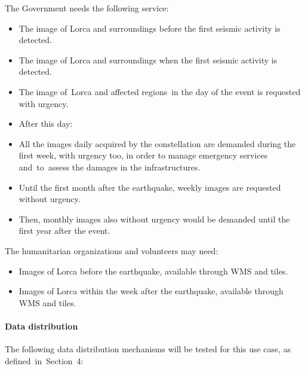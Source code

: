 \documentclass[a4paper]{article}
\newcommand\liststyleLFOiv{%
\renewcommand\labelitemi{[F0B7?]}
\renewcommand\labelitemii{o}
\renewcommand\labelitemiii{[F0A7?]}
\renewcommand\labelitemiv{[F0B7?]}
}
\newcommand\liststyleLFOv{%
\renewcommand\labelitemi{[F0FC?]}
\renewcommand\labelitemii{o}
\renewcommand\labelitemiii{[F0A7?]}
\renewcommand\labelitemiv{[F0B7?]}
}
\newcommand\liststyleLFOxii{%
\renewcommand\labelitemi{[F0B7?]}
\renewcommand\labelitemii{o}
\renewcommand\labelitemiii{[F0A7?]}
\renewcommand\labelitemiv{[F0B7?]}
}
\begin{document}
\bigskip

{
The Government needs the following service:}


\bigskip

\liststyleLFOiv
\begin{itemize}
\item {
The image of Lorca and surroundings before the first seismic activity is
detected.}
\item {
The image of Lorca and surroundings when the first seismic activity is
detected.}
\item {
The image of\ Lorca and affected regions\ in the day of the event is
requested with urgency.}
\item {
After this day:}
\end{itemize}
\liststyleLFOv
\begin{itemize}
\item {
All the images daily acquired by the constellation are demanded during
the first week, with urgency too, in order to manage emergency services
and\ to\ assess the damages in the infrastructures.\ }
\item {
Until the first month after the earthquake, weekly images are requested
without urgency.\ }
\item {
Then, monthly images also without urgency would be demanded until the
first year after the event.\ }
\end{itemize}
{
The humanitarian organizations and volunteers may need:}


\bigskip

\liststyleLFOxii
\begin{itemize}
\item {
Images of Lorca before the earthquake, available through WMS and tiles.}
\item {
Images of Lorca within the week after the earthquake, available through
WMS and tiles.}
\end{itemize}
\paragraph[Data distribution]{ Data
distribution}
The following data distribution mechanisms will be tested for this use
case, as defined\ in\ Section\ 4:
\end{document}
